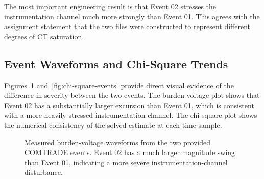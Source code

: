 \documentclass[11pt]{article}
\begin{document}
The most important engineering result is that Event 02 stresses the instrumentation channel much
more strongly than Event 01. This agrees with the assignment statement that the two files were
constructed to represent different degrees of CT saturation.

\subsection{Event Waveforms and Chi-Square Trends}
Figures~\ref{fig:burden-voltage-events} and~\ref{fig:chi-square-events} provide direct visual
evidence of the difference in severity between the two events. The burden-voltage plot shows that
Event 02 has a substantially larger excursion than Event 01, which is consistent with a more
heavily stressed instrumentation channel. The chi-square plot shows the numerical consistency of
the solved estimate at each time sample.

\begin{figure}[H]
  \centering
  \caption{Measured burden-voltage waveforms from the two provided COMTRADE events. Event 02 has
  a much larger magnitude swing than Event 01, indicating a more severe instrumentation-channel
  disturbance.}
  \label{fig:burden-voltage-events}
\end{figure}
\end{document}
